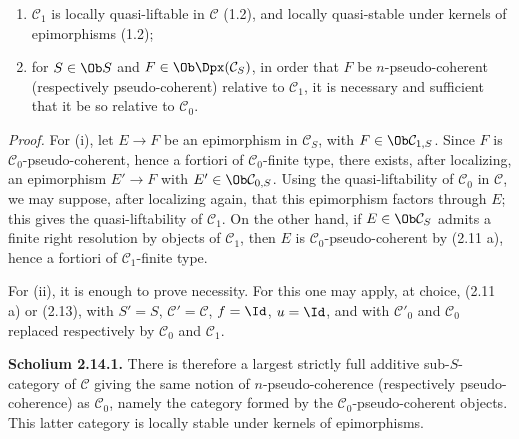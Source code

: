 \documentclass[11pt]{article}
\begin{document}
\begin{enumerate}[label=(\roman*)]
\item \(\mathcal C_1\) is locally quasi-liftable in \(\mathcal C\) (1.2), and locally quasi-stable under kernels of epimorphisms (1.2);
\item for \(S\in\Ob S\) and \(F\in\Ob\Dpx(\mathcal C_S)\), in order that \(F\) be \(n\)-pseudo-coherent (respectively pseudo-coherent) relative to \(\mathcal C_1\), it is necessary and sufficient that it be so relative to \(\mathcal C_0\).
\end{enumerate}

\emph{Proof.} For (i), let \(E\to F\) be an epimorphism in \(\mathcal C_S\), with \(F\in\Ob\mathcal C_{1,S}\). Since \(F\) is \(\mathcal C_0\)-pseudo-coherent, hence a fortiori of \(\mathcal C_0\)-finite type, there exists, after localizing, an epimorphism \(E'\to F\) with \(E'\in\Ob\mathcal C_{0,S}\). Using the quasi-liftability of \(\mathcal C_0\) in \(\mathcal C\), we may suppose, after localizing again, that this epimorphism factors through \(E\); this gives the quasi-liftability of \(\mathcal C_1\). On the other hand, if \(E\in\Ob\mathcal C_S\) admits a finite right resolution by objects of \(\mathcal C_1\), then \(E\) is \(\mathcal C_0\)-pseudo-coherent by (2.11 a), hence a fortiori of \(\mathcal C_1\)-finite type.

For (ii), it is enough to prove necessity. For this one may apply, at choice, (2.11 a) or (2.13), with \(S'=S\), \(\mathcal C'=\mathcal C\), \(f=\Id\), \(u=\Id\), and with \(\mathcal C'_0\) and \(\mathcal C_0\) replaced respectively by \(\mathcal C_0\) and \(\mathcal C_1\).

\textbf{Scholium 2.14.1.} There is therefore a largest strictly full additive sub-\(S\)-category of \(\mathcal C\) giving the same notion of \(n\)-pseudo-coherence (respectively pseudo-coherence) as \(\mathcal C_0\), namely the category formed by the \(\mathcal C_0\)-pseudo-coherent objects. This latter category is locally stable under kernels of epimorphisms.
\end{document}
